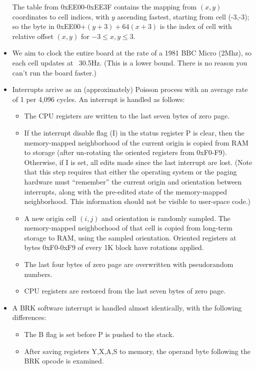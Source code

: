 \documentclass{article}
\begin{document}
\begin{itemize}
  The table from 0xEE00-0xEE3F contains the mapping from $(x,y)$ coordinates to cell indices,
  with $y$ ascending fastest, starting from cell (-3,-3);
  so the byte in 0xEE00$+(y+3)+64(x+3)$ is the index of cell with relative offset $(x,y)$
  for $-3 \leq x,y \leq 3$.
    
\item We aim to clock the entire board at the rate of a 1981 BBC Micro (2Mhz), so each cell updates at ~30.5Hz.
 (This is a lower bound. There is no reason you can't run the board faster.)
\item Interrupts arrive as an (approximately) Poisson process with an average rate of 1 per 4,096 cycles.
  An interrupt is handled as follows:
\begin{itemize}
\item The CPU registers are written to the last seven bytes of zero page.
\item If the interrupt disable flag (I) in the status register P is clear, then the memory-mapped neighborhood of the current origin is copied from RAM to storage (after un-rotating the oriented registers from 0xF0-F9). Otherwise, if I is set, all edits made since the last interrupt are lost. (Note that this step requires that either the operating system or the paging hardware must ``remember'' the current origin and orientation between interrupts, along with the pre-edited state of the memory-mapped neighborhood. This information should not be visible to user-space code.)
\item A new origin cell $(i,j)$ and orientation is randomly sampled. The memory-mapped neighborhood of that cell is copied from long-term storage to RAM, using the sampled orientation. Oriented registers at bytes 0xF0-0xF9 of every 1K block have rotations applied.
\item The last four bytes of zero page are overwritten with pseudorandom numbers.
\item CPU registers are restored from the last seven bytes of zero page.
\end{itemize}
\item A BRK software interrupt is handled almost identically, with the following differences:
  \begin{itemize}
    \item The B flag is set before P is pushed to the stack.
    \item After saving registers Y,X,A,S to memory, the operand byte following the BRK opcode is examined.
      

\end{itemize}
\end{itemize}
\end{document}

